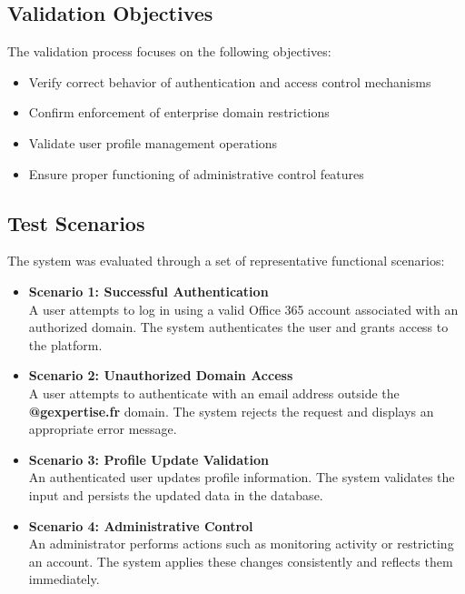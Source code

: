 \subsection{Validation Objectives}

The validation process focuses on the following objectives:

\begin{itemize}
    \item Verify correct behavior of authentication and access control mechanisms
    \item Confirm enforcement of enterprise domain restrictions
    \item Validate user profile management operations
    \item Ensure proper functioning of administrative control features
\end{itemize}

\subsection{Test Scenarios}

The system was evaluated through a set of representative functional scenarios:

\begin{itemize}
    \item \textbf{Scenario 1: Successful Authentication} \\
    A user attempts to log in using a valid Office 365 account associated with an authorized domain. The system authenticates the user and grants access to the platform.

    \item \textbf{Scenario 2: Unauthorized Domain Access} \\
    A user attempts to authenticate with an email address outside the \textbf{@gexpertise.fr} domain. The system rejects the request and displays an appropriate error message.

    \item \textbf{Scenario 3: Profile Update Validation} \\
    An authenticated user updates profile information. The system validates the input and persists the updated data in the database.

    \item \textbf{Scenario 4: Administrative Control} \\
    An administrator performs actions such as monitoring activity or restricting an account. The system applies these changes consistently and reflects them immediately.
\end{itemize}

